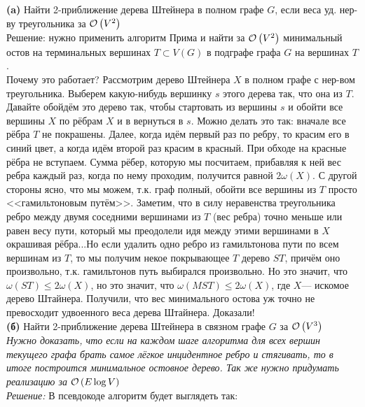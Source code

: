 \textbf{(a)} Найти 2-приближение дерева Штейнера в полном графе $G$, если веса уд. нер-ву треугольника за $\mathcal{O}\left(V^2\right)$\\
Решение: нужно применить алгоритм Прима и найти за $\mathcal{O}\left(V^2\right)$ минимальный остов на терминальных вершинах $T\subset V(G)$
в подграфе графа $G$ на вершинах $T$.\\
Почему это работает? Рассмотрим дерево Штейнера $X$ в полном графе с нер-вом треугольника. Выберем какую-нибудь вершинку $s$
этого дерева так, что она из $T$. Давайте обойдём это дерево так, чтобы стартовать из вершины $s$ и обойти все вершины $X$
по рёбрам $X$ и в вернуться в $s$. Можно делать это так: вначале все рёбра $T$ не покрашены. Далее, когда идём первый раз
по ребру, то красим его в синий цвет, а когда идём второй раз красим в красный. При обходе на красные рёбра не вступаем.
Сумма рёбер, которую мы посчитаем, прибавляя к ней вес ребра каждый раз, когда по нему проходим, получится равной $2\omega(X)$.
С другой стороны ясно, что мы можем, т.к. граф полный, обойти все вершины из $T$ просто <<гамильтоновым путём>>. Заметим,
что в силу неравенства треугольника ребро между двумя соседними вершинами из $T$ (вес ребра) точно меньше или равен весу пути,
который мы преодолели идя между этими вершинами в $X$ окрашивая рёбра...Но если удалить одно ребро из гамильтонова пути
по всем вершинам из $T$, то мы получим некое покрывающее $T$ дерево $ST$, причём оно произвольно, т.к. гамильтонов путь выбирался 
произвольно. Но это значит, что $\omega(ST) \leq 2\omega(X)$, но это значит, что $\omega(MST) \leq 2\omega(X)$, где $X$---
искомое дерево Штайнера. Получили, что вес минимального остова уж точно не превосходит удвоенного веса дерева Штайнера.
Доказали! \xqed\\

\textbf{(б)} Найти 2-приближение дерева Штейнера в связном графе $G$ за $\mathcal{O}\left(V^3\right)$\\

\textit{Нужно доказать, что если на каждом шаге алгоритма для всех вершин текущего графа брать самое лёгкое инцидентное
ребро и стягивать, то в итоге построится минимальное остовное дерево. Так же нужно придумать реализацию за $\mathcal{O}\left(E\log{V}\right)$}\\
\textit{Решение:}
В псевдокоде алгоритм будет выглядеть так:

